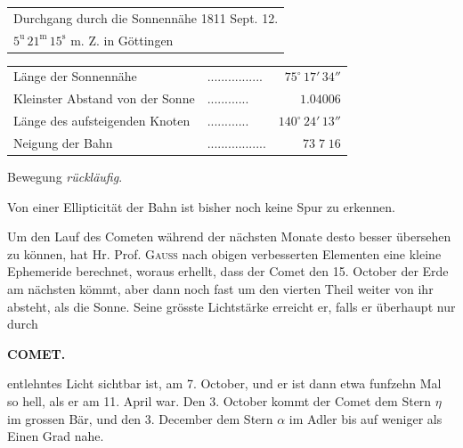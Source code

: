\begin{center}\fontsize{10}{12}\selectfont\setlength{\tabcolsep}{4pt}\renewcommand{\arraystretch}{1.15}\begin{tabular}{l}
Durchgang durch die Sonnennähe 1811 Sept. 12.\\
\quad $5^{\mathrm u}\,21^{\mathrm m}\,15^{\mathrm s}$ m. Z. in Göttingen\\
\end{tabular}\end{center}
\begin{center}\fontsize{9}{11}\selectfont\setlength{\tabcolsep}{2pt}\renewcommand{\arraystretch}{1.15}\begin{tabular}{llr}
Länge der Sonnennähe & .\;.\;.\;.\;.\;.\;.\;.\;.\;.\;.\;.\;.\;.\;.\;. & $75^\circ\,17'\,34''$\\
Kleinster Abstand von der Sonne & .\;.\;.\;.\;.\;.\;.\;.\;.\;.\;.\;. & $1.04006$\\
Länge des aufsteigenden Knoten & .\;.\;.\;.\;.\;.\;.\;.\;.\;.\;.\;. & $140^\circ\,24'\,13''$\\
Neigung der Bahn & .\;.\;.\;.\;.\;.\;.\;.\;.\;.\;.\;.\;.\;.\;.\;.\;. & $73\;7\;16$\\
\end{tabular}\end{center}
\noindent Bewegung \emph{rückläufig}.

\par\indent Von einer Ellipticität der Bahn ist bisher noch keine Spur zu erkennen.

\par\indent Um den Lauf des Cometen während der nächsten Monate desto besser übersehen zu können, hat Hr. Prof. \textsc{Gauss} nach obigen verbesserten Elementen eine kleine Ephemeride berechnet, woraus erhellt, dass der Comet den 15. October der Erde am nächsten kömmt, aber dann noch fast um den vierten Theil weiter von ihr absteht, als die Sonne. Seine grösste Lichtstärke erreicht er, falls er überhaupt nur durch
\par
{}
\clearpage
\thispagestyle{empty}
\noindent{}%
%
\parbox[t]{\dimexpr\linewidth-24mm\relax}{\centering\footnotesize\bfseries COMET.\par}%
\makebox[12mm][r]{}\par\nobreak\medskip
\noindent entlehntes Licht sichtbar ist, am 7. October, und er ist dann etwa funfzehn Mal so hell, als er am 11. April war. Den 3. October kommt der Comet dem Stern $\eta$ im grossen Bär, und den 3. December dem Stern $\alpha$ im Adler bis auf weniger als Einen Grad nahe.

